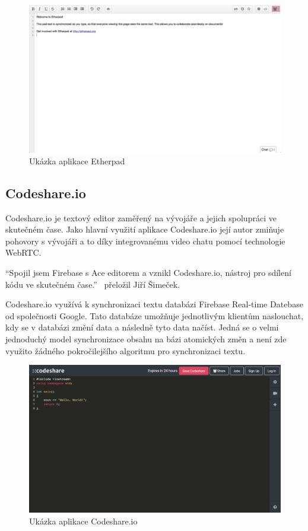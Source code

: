 \begin{figure}[ht]
    \centering
    \includegraphics[width=\textwidth]{partials/analyza/etherpad}
    \caption{Ukázka aplikace Etherpad}\label{fig:etherpad}
\end{figure}

\subsection{Codeshare.io}\label{subsec:codeshare.io}

Codeshare.io je textový editor zaměřený na vývojáře a jejich spolupráci ve skutečném čase.
Jako hlavní využití aplikace Codeshare.io její autor zmiňuje pohovory s vývojáři a to díky integrovanému video chatu pomocí technologie WebRTC.~\cite{codeshare:home}

\enquote{Spojil jsem Firebase s Ace editorem a vznikl Codeshare.io, nástroj pro sdílení kódu ve skutečném čase.}~\cite{codeshare:created} přeložil Jiří Šimeček.

Codeshare.io využívá k synchronizaci textu databázi Firebase Real-time Datebase od společnosti Google.
Tato databáze umožňuje jednotlivým klientům naslouchat, kdy se v databázi změní data a následně tyto data načíst.
Jedná se o velmi jednoduchý model synchronizace obsahu na bázi atomických změn a není zde využito žádného pokročilejšího algoritmu pro synchronizaci textu.~\cite{codeshare:created}

\begin{figure}[ht]
    \centering
    \includegraphics[width=\textwidth]{partials/analyza/codeshare}
    \caption{Ukázka aplikace Codeshare.io}\label{fig:codeshare}
\end{figure}
